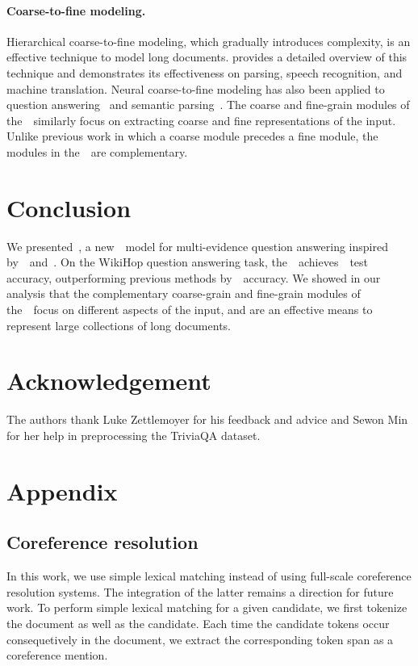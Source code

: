\documentclass{article} \usepackage{iclr2019_conference,times}
\begin{document}
\paragraph{Coarse-to-fine modeling.}
Hierarchical coarse-to-fine modeling, which gradually introduces complexity, is an effective technique to model long documents.
\citet{Petrov2009coarse} provides a detailed overview of this technique and demonstrates its effectiveness on parsing, speech recognition, and machine translation.
Neural coarse-to-fine modeling has also been applied to question answering~\citep{choi2017coarse,min2018efficient,swayamdipta2018multi} and semantic parsing~\citep{dong2018coarse}.
The coarse and fine-grain modules of the~\modelnameshort~similarly focus on extracting coarse and fine representations of the input.
Unlike previous work in which a coarse module precedes a fine module, the modules in the~\modelnameshort~are complementary.



\section{Conclusion}
We presented~\modelnameshort, a new~\sota~model for multi-evidence question answering inspired by~\coarsereasoning~and~\finereasoning.
On the WikiHop question answering task, the~\modelnameshort~achieves~\testacc~test accuracy, outperforming previous methods by~\sotadiff~accuracy.
We showed in our analysis that the complementary coarse-grain and fine-grain modules of the~\modelnameshort~focus on different aspects of the input, and are an effective means to represent large collections of long documents.


\section*{Acknowledgement}
The authors thank Luke Zettlemoyer for his feedback and advice and Sewon Min for her help in preprocessing the TriviaQA dataset.





\clearpage{}\clearpage

\appendix


\section{Appendix}

\subsection{Coreference resolution}
\label{appendix:coref}
In this work, we use simple lexical matching instead of using full-scale coreference resolution systems.
The integration of the latter remains a direction for future work.
To perform simple lexical matching for a given candidate, we first tokenize the document as well as the candidate.
Each time the candidate tokens occur consequetively in the document, we extract the corresponding token span as a coreference mention.
\end{document}
